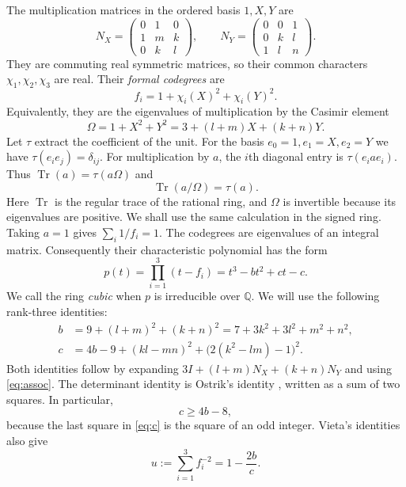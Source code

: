 \documentclass[11pt,a4paper]{article}
\theoremstyle{definition}
\theoremstyle{remark}
\newcommand{\Q}{\mathbb Q}
\numberwithin{equation}{section}
\begin{document}
The multiplication matrices in the ordered basis $1,X,Y$ are
\[
 N_X=\begin{pmatrix}0&1&0\\1&m&k\\0&k&l\end{pmatrix},\qquad
 N_Y=\begin{pmatrix}0&0&1\\0&k&l\\1&l&n\end{pmatrix}.
\]
They are commuting real symmetric matrices, so their common characters
$\chi_1,\chi_2,\chi_3$ are real. Their \emph{formal codegrees} are
\[
 f_i=1+\chi_i(X)^2+\chi_i(Y)^2.
\]
Equivalently, they are the eigenvalues of multiplication by the
Casimir element
\[
 \Omega=1+X^2+Y^2=3+(l+m)X+(k+n)Y.
\]
Let $\tau$ extract the coefficient of the unit. For the basis
$e_0=1,e_1=X,e_2=Y$ we have $\tau(e_i e_j)=\delta_{ij}$.
For multiplication by $a$, the $i$th diagonal entry is
$\tau(e_i a e_i)$. Thus $\operatorname{Tr}(a)=\tau(a\Omega)$ and
\begin{equation}\label{eq:casimir-trace}
 \operatorname{Tr}(a/\Omega)=\tau(a).
\end{equation}
Here $\operatorname{Tr}$ is the regular trace of the rational ring,
and $\Omega$ is invertible because its eigenvalues are positive.
We shall use the same calculation in the signed ring. Taking $a=1$
gives $\sum_i 1/f_i=1$. The codegrees are eigenvalues of an integral
matrix. Consequently their characteristic polynomial has the form
\begin{equation}\label{eq:poly}
 p(t)=\prod_{i=1}^3(t-f_i)=t^3-bt^2+ct-c.
\end{equation}
We call the ring \emph{cubic} when $p$ is irreducible over $\Q$. We will use the following rank-three identities:
\begin{align}
 b&=9+(l+m)^2+(k+n)^2
   =7+3k^2+3l^2+m^2+n^2,\label{eq:b}\\
 c&=4b-9+(kl-mn)^2+\bigl(2(k^2-lm)-1\bigr)^2.\label{eq:c}
\end{align}
Both identities follow by expanding
$3I+(l+m)N_X+(k+n)N_Y$ and using \eqref{eq:assoc}.
The determinant identity is Ostrik's identity
\cite[equation~(12)]{Ostrik}, written as a sum of two squares. In particular,
\begin{equation}\label{eq:lower}
 c\geq 4b-8,
\end{equation}
because the last square in \eqref{eq:c} is the square of an odd integer. Vieta's identities also give
\begin{equation}\label{eq:inverse-square}
 u:=\sum_{i=1}^3 f_i^{-2}=1-\frac{2b}{c}.
\end{equation}
\end{document}
